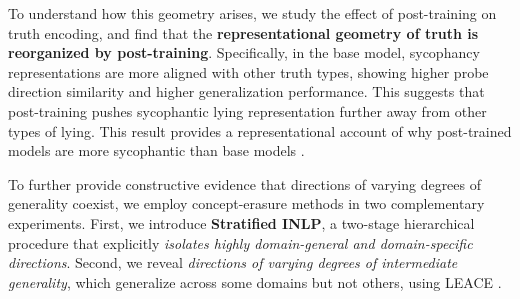 \documentclass{article}
\theoremstyle{plain}
\theoremstyle{definition}
\theoremstyle{remark}
\begin{document}
To understand how this geometry arises, we study the effect of post-training on truth encoding, and find that the \textbf{representational geometry of truth is reorganized by post-training}. Specifically, in the base model, sycophancy representations are more aligned with other truth types, showing higher probe direction similarity and higher generalization performance. This suggests that post-training pushes sycophantic lying representation further away from other types of lying. This result provides a representational account of why post-trained models are more sycophantic than base models \cite{wei2023simple, sharma2024towards}.

To further provide constructive evidence that directions of varying degrees of generality coexist, we employ concept-erasure methods \cite{ravfogel2020null, belrose2023leace} in two complementary experiments. First, we introduce \textbf{Stratified INLP}, a two-stage hierarchical procedure that explicitly \textit{isolates highly domain-general and domain-specific directions}. 
Second, we reveal \emph{directions of varying degrees of intermediate generality}, which generalize across some domains but not others, using LEACE \cite{belrose2023leace}.



\end{document}
